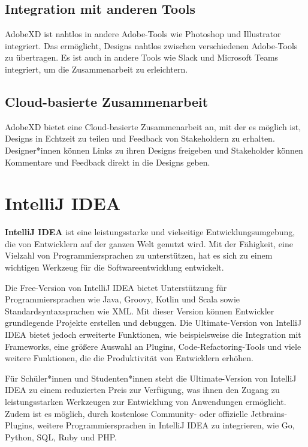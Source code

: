 \subsection*{Integration mit anderen Tools} 
AdobeXD ist nahtlos in andere Adobe-Tools wie Photoshop und Illustrator integriert. Das ermöglicht, Designs nahtlos zwischen verschiedenen Adobe-Tools zu übertragen. 
Es ist auch in andere Tools wie Slack und Microsoft Teams integriert, um die Zusammenarbeit zu erleichtern.

\subsection*{Cloud-basierte Zusammenarbeit} 
AdobeXD bietet eine Cloud-basierte Zusammenarbeit an, mit der es möglich ist, Designs in Echtzeit zu teilen und Feedback von Stakeholdern zu erhalten. 
Designer*innen können Links zu ihren Designs freigeben und Stakeholder können Kommentare und Feedback direkt in die Designs geben.

\section{IntelliJ IDEA}

\textbf{IntelliJ IDEA} ist eine leistungsstarke und vielseitige Entwicklungsumgebung, die von Entwicklern auf der ganzen Welt genutzt wird. Mit der Fähigkeit, eine Vielzahl von Programmiersprachen zu unterstützen, hat es sich zu einem wichtigen Werkzeug für die Softwareentwicklung entwickelt.

Die Free-Version von IntelliJ IDEA bietet Unterstützung für Programmiersprachen wie Java, Groovy, Kotlin und Scala sowie Standardsyntaxsprachen wie XML. Mit dieser Version können Entwickler grundlegende Projekte erstellen und debuggen. Die Ultimate-Version von IntelliJ IDEA bietet jedoch erweiterte Funktionen, wie beispielsweise die Integration mit Frameworks, eine größere Auswahl an Plugins, Code-Refactoring-Tools und viele weitere Funktionen, die die Produktivität von Entwicklern erhöhen.

Für Schüler*innen und Studenten*innen steht die Ultimate-Version von IntelliJ IDEA zu einem reduzierten Preis zur Verfügung, was ihnen den Zugang zu leistungsstarken Werkzeugen zur Entwicklung von Anwendungen ermöglicht. Zudem ist es möglich, durch kostenlose Community- oder offizielle Jetbrains-Plugins, weitere Programmiersprachen in IntelliJ IDEA zu integrieren, wie Go, Python, SQL, Ruby und PHP.

